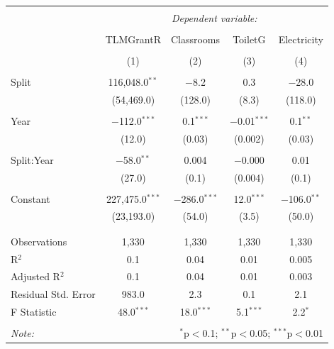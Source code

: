 \documentclass[12pt, a4paper]{article}
\begin{document}
\begin{table}[!htbp] \centering 
  \caption{} 
  \label{} 
\begin{tabular}{@{\extracolsep{5pt}}lcccc} 
\\[-1.8ex]\hline 
\hline \\[-1.8ex] 
 & \multicolumn{4}{c}{\textit{Dependent variable:}} \\ 
\cline{2-5} 
\\[-1.8ex] & TLMGrantR & Classrooms & ToiletG & Electricity \\ 
\\[-1.8ex] & (1) & (2) & (3) & (4)\\ 
\hline \\[-1.8ex] 
 Split & 116,048.0$^{**}$ & $-$8.2 & 0.3 & $-$28.0 \\ 
  & (54,469.0) & (128.0) & (8.3) & (118.0) \\ 
  & & & & \\ 
 Year & $-$112.0$^{***}$ & 0.1$^{***}$ & $-$0.01$^{***}$ & 0.1$^{**}$ \\ 
  & (12.0) & (0.03) & (0.002) & (0.03) \\ 
  & & & & \\ 
 Split:Year & $-$58.0$^{**}$ & 0.004 & $-$0.000 & 0.01 \\ 
  & (27.0) & (0.1) & (0.004) & (0.1) \\ 
  & & & & \\ 
 Constant & 227,475.0$^{***}$ & $-$286.0$^{***}$ & 12.0$^{***}$ & $-$106.0$^{**}$ \\ 
  & (23,193.0) & (54.0) & (3.5) & (50.0) \\ 
  & & & & \\ 
\hline \\[-1.8ex] 
Observations & 1,330 & 1,330 & 1,330 & 1,330 \\ 
R$^{2}$ & 0.1 & 0.04 & 0.01 & 0.005 \\ 
Adjusted R$^{2}$ & 0.1 & 0.04 & 0.01 & 0.003 \\ 
Residual Std. Error & 983.0 & 2.3 & 0.1 & 2.1 \\ 
F Statistic & 48.0$^{***}$ & 18.0$^{***}$ & 5.1$^{***}$ & 2.2$^{*}$ \\ 
\hline 
\hline \\[-1.8ex] 
\textit{Note:}  & \multicolumn{4}{r}{$^{*}$p$<$0.1; $^{**}$p$<$0.05; $^{***}$p$<$0.01} \\ 
\end{tabular} 
\end{table} %
\end{document}
